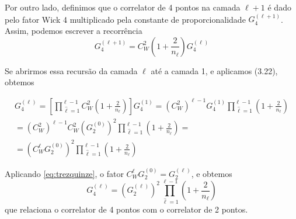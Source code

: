 \documentclass{beamer}
\def\mi#1{{\,\widehat{#1}}}
\def\eell{{(\ell)}}
\def\eellum{{(\ell+1)}}
\begin{document}
\begin{frame}
	Por outro lado, definimos que o correlator de 4 pontos na camada $\ell+1$ é dado pelo fator Wick 4 multiplicado pela constante de proporcionalidade $G_4^\eellum$. Assim, podemos escrever a recorrência
	\begin{equation*}\tag{3.24}
		G_4^{(\ell+1)} = {C_W^2}\left(1 + \frac{2}{n_\ell}\right)G_4^{(\ell)}
	\end{equation*}
\end{frame}

\begin{frame}	
	Se abrirmos essa recursão da camada $\ell$ até a camada 1, e aplicamos (3.22), obtemos

	\begin{multline*}
		G_4^\eell\! =\! \left[\prod_{\mi{\ell}=1}^{\ell-1}C_W^2\left(1 + \frac{2}{n_{\ell}}\right)\right]\!G_4^{(1)} 
		= \left(C_W^2\right)^{\ell-1}G_4^{(1)}\prod_{\mi{\ell}=1}^{\ell-1}\left(1 + \frac{2}{n_{\ell}}\right) \\ = \left(C_W^2\right)^{\ell-1}C_W^2\left(G_2^{(0)}\right)^2\prod_{\mi{\ell}=1}^{\ell-1}\left(1 + \frac{2}{n_{\ell}}\right)  = \\=  \left(C_W^{\ell}G_2^{(0)}\right)^2\prod_{\mi{\ell}=1}^{\ell-1}\left(1 + \frac{2}{n_{\ell}}\right)
	\end{multline*} 
\end{frame}

\begin{frame}

	Aplicando \eqref{eq:trezquinze}, o fator $C_W^{\ell}G_2^{(0)} = G_2^\eell$, e obtemos
	\begin{equation*}\tag{3.25}
		G_4^\eell = \left(G_2^\eell\right)^2\prod_{\mi{\ell}=1}^{\ell-1}\left(1 + \frac{2}{n_{\ell}}\right)
	\end{equation*}
	que relaciona o correlator de 4 pontos com o correlator de 2 pontos.

\end{frame}
\end{document}

